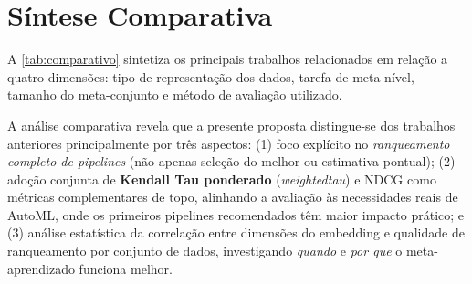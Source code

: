 \section{Síntese Comparativa}
\label{sec:sintese-comparativa}

A \autoref{tab:comparativo} sintetiza os principais trabalhos relacionados em relação a quatro dimensões: tipo de representação dos dados, tarefa de meta-nível, tamanho do meta-conjunto e método de avaliação utilizado.

\begin{table}[H]
\centering
\caption{Comparativo entre trabalhos relacionados e a proposta deste TCC}
\label{tab:comparativo}
\fonte{}
\end{table}

A análise comparativa revela que a presente proposta distingue-se dos trabalhos anteriores principalmente por três aspectos: (1) foco explícito no \textit{ranqueamento completo de pipelines} (não apenas seleção do melhor ou estimativa pontual); (2) adoção conjunta de \textbf{Kendall Tau ponderado} (\textit{weightedtau}) e NDCG como métricas complementares de topo, alinhando a avaliação às necessidades reais de AutoML, onde os primeiros pipelines recomendados têm maior impacto prático; e (3) análise estatística da correlação entre dimensões do embedding e qualidade de ranqueamento por conjunto de dados, investigando \textit{quando} e \textit{por que} o meta-aprendizado funciona melhor.

